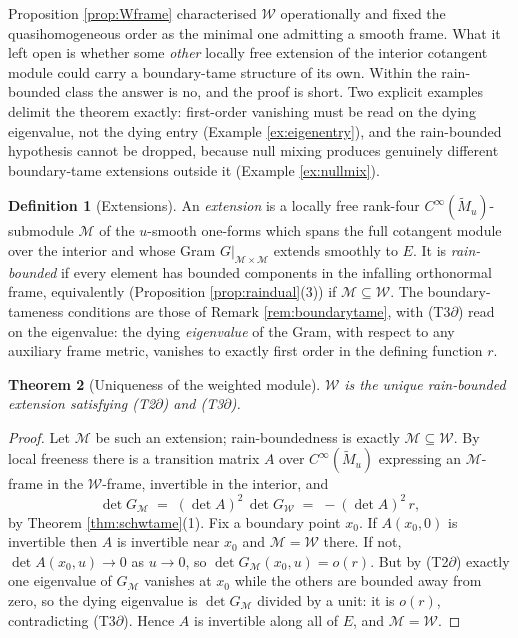 \documentclass[11pt]{article}
\newtheorem{theorem}{Theorem}[section]
\theoremstyle{definition}
\newtheorem{definition}[theorem]{Definition}
\newcommand{\shW}{\mathcal{W}}
\newcommand{\Mt}{\widetilde{M}}
\begin{document}
Proposition \ref{prop:Wframe} characterised $\shW$ operationally and fixed the quasihomogeneous order as the minimal one admitting a smooth frame. What it left open is whether some \emph{other} locally free extension of the interior cotangent module could carry a boundary-tame structure of its own. Within the rain-bounded class the answer is no, and the proof is short. Two explicit examples delimit the theorem exactly: first-order vanishing must be read on the dying eigenvalue, not the dying entry (Example \ref{ex:eigenentry}), and the rain-bounded hypothesis cannot be dropped, because null mixing produces genuinely different boundary-tame extensions outside it (Example \ref{ex:nullmix}).

\begin{definition}[Extensions]\label{def:extension}
An \emph{extension} is a locally free rank-four $C^\infty(\Mt_u)$-submodule $\mathcal{M}$ of the $u$-smooth one-forms which spans the full cotangent module over the interior and whose Gram $G|_{\mathcal{M}\times\mathcal{M}}$ extends smoothly to $E$. It is \emph{rain-bounded} if every element has bounded components in the infalling orthonormal frame, equivalently (Proposition \ref{prop:raindual}(3)) if $\mathcal{M} \subseteq \shW$. The boundary-tameness conditions are those of Remark \ref{rem:boundarytame}, with (T3$\partial$) read on the eigenvalue: the dying \emph{eigenvalue} of the Gram, with respect to any auxiliary frame metric, vanishes to exactly first order in the defining function $r$.
\end{definition}

\begin{theorem}[Uniqueness of the weighted module]\label{thm:uniqueW}
$\shW$ is the unique rain-bounded extension satisfying (T2$\partial$) and (T3$\partial$).
\end{theorem}

\begin{proof}
Let $\mathcal{M}$ be such an extension; rain-boundedness is exactly $\mathcal{M} \subseteq \shW$. By local freeness there is a transition matrix $A$ over $C^\infty(\Mt_u)$ expressing an $\mathcal{M}$-frame in the $\shW$-frame, invertible in the interior, and
\[
\det G_{\mathcal{M}} \;=\; (\det A)^2 \,\det G_{\shW} \;=\; -(\det A)^2\, r ,
\]
by Theorem \ref{thm:schwtame}(1). Fix a boundary point $x_0$. If $A(x_0, 0)$ is invertible then $A$ is invertible near $x_0$ and $\mathcal{M} = \shW$ there. If not, $\det A(x_0, u) \to 0$ as $u \to 0$, so $\det G_{\mathcal{M}}(x_0, u) = o(r)$. But by (T2$\partial$) exactly one eigenvalue of $G_{\mathcal{M}}$ vanishes at $x_0$ while the others are bounded away from zero, so the dying eigenvalue is $\det G_{\mathcal{M}}$ divided by a unit: it is $o(r)$, contradicting (T3$\partial$). Hence $A$ is invertible along all of $E$, and $\mathcal{M} = \shW$.
\end{proof}
\end{document}

